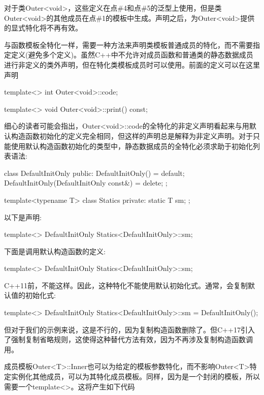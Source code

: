 对于类Outer<void>，这些定义在点\#4和点\#5的泛型上使用，但是类Outer<void>的其他成员在点\#1的模板中生成。声明之后，为Outer<void>提供的显式特化将不再有效。

与函数模板全特化一样，需要一种方法来声明类模板普通成员的特化，而不需要指定定义(避免多个定义)。虽然C++中不允许对成员函数和普通类的静态数据成员进行非定义的类外声明，但在特化类模板成员时可以使用。前面的定义可以在这里声明

\begin{cpp}
template<>
int Outer<void>::code;

template<>
void Outer<void>::print() const;
\end{cpp}

细心的读者可能会指出，Outer<void>::code的全特化的非定义声明看起来与用默认构造函数初始化的定义完全相同，但这样的声明总是解释为非定义声明。对于只能使用默认构造函数初始化的类型中，静态数据成员的全特化必须求助于初始化列表语法:

\begin{cpp}
class DefaultInitOnly {
	public:
	DefaultInitOnly() = default;
	DefaultInitOnly(DefaultInitOnly const&) = delete;
};

template<typename T>
class Statics {
	private:
	static T sm;
};
\end{cpp}

以下是声明:

\begin{cpp}
template<>
DefaultInitOnly Statics<DefaultInitOnly>::sm;
\end{cpp}

下面是调用默认构造函数的定义:

\begin{cpp}
template<>
DefaultInitOnly Statics<DefaultInitOnly>::sm{};
\end{cpp}

C++11前，不能这样。因此，这种特化不能使用默认初始化式。通常，会复制默认值的初始化式:

\begin{cpp}
template<>
DefaultInitOnly Statics<DefaultInitOnly>::sm = DefaultInitOnly();
\end{cpp}

但对于我们的示例来说，这是不行的，因为复制构造函数删除了。但C++17引入了强制复制省略规则，这使得这种替代方法有效，因为不再涉及复制构造函数调用。

成员模板Outer<T>::Inner也可以为给定的模板参数特化，而不影响Outer<T>特定实例化其他成员，可以为其特化成员模板。同样，因为是一个封闭的模板，所以需要一个template<>。这将产生如下代码

